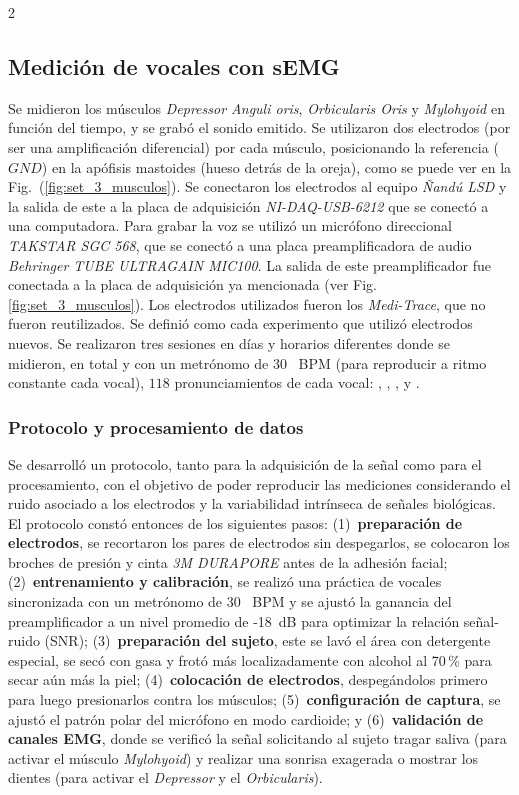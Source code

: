 \documentclass[11pt, letterpaper]{article}
\begin{document}
\begin{multicols*}{2}
\subsection{Medición de vocales con sEMG}

Se midieron los músculos \textit{Depressor Anguli oris}, \textit{Orbicularis Oris} y \textit{Mylohyoid} en función del tiempo, y se grabó el sonido emitido. Se utilizaron dos electrodos (por ser una amplificación diferencial) por cada músculo, posicionando la referencia ($GND$) en la apófisis mastoides (hueso detrás de la oreja), como se puede ver en la Fig.~(\ref{fig:set_3_musculos}). Se conectaron los electrodos al equipo \textit{Ñandú LSD} y la salida de este a la placa de adquisición \textit{NI-DAQ-USB-6212} que se conectó a una computadora. Para grabar la voz se utilizó un micrófono direccional \textit{TAKSTAR SGC 568}, que se conectó a una placa preamplificadora de audio \textit{Behringer TUBE ULTRAGAIN MIC100}. La salida de este preamplificador fue conectada a la placa de adquisición ya mencionada (ver Fig. \ref{fig:set_3_musculos}). Los electrodos utilizados fueron los \textit{Medi-Trace}, que no fueron reutilizados. Se definió como  cada experimento que utilizó electrodos nuevos. Se realizaron tres sesiones en días y horarios diferentes donde se midieron, en total y con un metrónomo de 30 ~BPM (para reproducir a ritmo constante cada vocal), $118$ pronunciamientos de cada vocal: , , ,  y .

\subsubsection{Protocolo y procesamiento de datos}

Se desarrolló un protocolo, tanto para la adquisición de la señal como para el procesamiento, con el objetivo de poder reproducir las mediciones considerando el ruido asociado a los electrodos \cite{informeElectrodos2025} y la variabilidad intrínseca de señales biológicas. %
El protocolo constó entonces de los siguientes pasos: 
(1)~\textbf{preparación de electrodos}, se recortaron los pares de electrodos sin despegarlos, se colocaron los broches de presión y cinta \textit{3M DURAPORE} antes de la adhesión facial; 
(2)~\textbf{entrenamiento y calibración}, se realizó una práctica de vocales sincronizada con un metrónomo de 30 ~BPM y se ajustó la ganancia del preamplificador a un nivel promedio de -18~dB para optimizar la relación señal-ruido (SNR);
(3)~\textbf{preparación del sujeto}, este se lavó el área con detergente especial, se secó con gasa y frotó más localizadamente con alcohol al 70\,\% para secar aún más la piel;
(4)~\textbf{colocación de electrodos}, despegándolos primero para luego presionarlos contra los músculos;
(5)~\textbf{configuración de captura}, se ajustó el patrón polar del micrófono en modo cardioide; y 
(6)~\textbf{validación de canales EMG}, donde se verificó la señal solicitando al sujeto tragar saliva (para activar el músculo \textit{Mylohyoid}) y realizar una sonrisa exagerada o mostrar los dientes (para activar el \textit{Depressor} y el \textit{Orbicularis}).


\end{multicols*}
\end{document}
